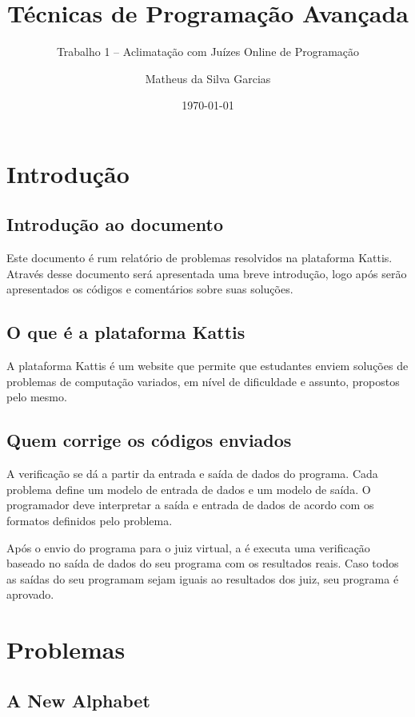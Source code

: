 \documentclass{article}
\title{Técnicas de Programação Avançada}
\subtitle{Trabalho 1 -- Aclimatação com Juízes Online de Programação}
\date{\today}
\author{Matheus da Silva Garcias}
\begin{document}
    \maketitle
    \newpage

    \section{Introdução}
        \subsection{Introdução ao documento}
            Este documento é rum relatório de problemas resolvidos na plataforma Kattis. Através desse documento será apresentada uma breve introdução, logo após serão apresentados os códigos e comentários sobre suas soluções.
        \subsection{O que é a plataforma Kattis}
            A plataforma Kattis é um website que permite que estudantes enviem soluções de problemas de computação variados, em nível de dificuldade e assunto, propostos pelo mesmo.
        \subsection{Quem corrige os códigos enviados}
            A verificação se dá a partir da entrada e saída de dados do programa. Cada problema define um modelo de entrada de dados e um modelo de saída. O programador deve interpretar a saída e entrada de dados de acordo com os formatos definidos pelo problema.
            \par Após o envio do programa para o juiz virtual, a é executa uma verificação baseado no saída de dados do seu programa com os resultados reais. Caso todos as saídas do seu programam sejam iguais ao resultados dos juiz, seu programa é aprovado.

    \section{Problemas}
        \subsection{A New Alphabet}
            
    
\end{document}
